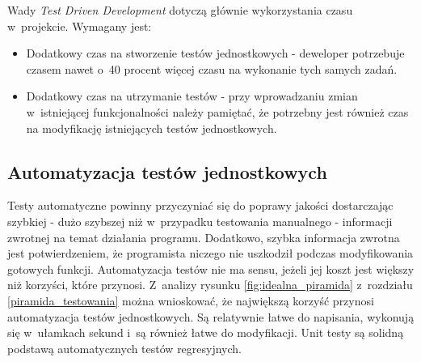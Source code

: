 Wady \textit{Test Driven Development} dotyczą głównie wykorzystania czasu w~projekcie. Wymagany jest:

\begin{itemize}
\item
Dodatkowy czas na stworzenie testów jednostkowych - deweloper potrzebuje czasem nawet o~40 procent więcej czasu na wykonanie tych samych zadań.
\item
Dodatkowy czas na utrzymanie testów - przy wprowadzaniu zmian w~istniejącej funkcjonalności należy pamiętać, że potrzebny jest również czas na modyfikację istniejących testów jednostkowych.
\end{itemize}

\subsection{Automatyzacja testów jednostkowych}
Testy automatyczne powinny przyczyniać się do poprawy jakości dostarczając szybkiej - dużo szybszej niż w~przypadku testowania manualnego - informacji zwrotnej na temat działania programu. Dodatkowo, szybka informacja zwrotna jest potwierdzeniem, że programista niczego nie uszkodził podczas modyfikowania gotowych funkcji.
Automatyzacja testów nie ma sensu, jeżeli jej koszt jest większy niż korzyści, które przynosi. Z~analizy rysunku \ref{fig:idealna_piramida} z~rozdziału \ref{piramida_testowania} można wnioskować, że największą korzyść przynosi automatyzacja testów jednostkowych. Są relatywnie łatwe do napisania, wykonują się w~ułamkach sekund i~są również łatwe do modyfikacji. Unit testy są solidną podstawą automatycznych testów regresyjnych.

